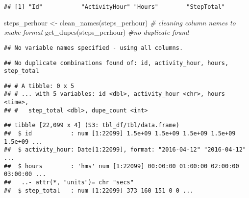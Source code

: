 \documentclass[
]{article}
\newenvironment{Shaded}{\begin{snugshade}}{\end{snugshade}}
\newcommand{\CommentTok}[1]{\textcolor[rgb]{0.56,0.35,0.01}{\textit{#1}}}
\newcommand{\FunctionTok}[1]{\textcolor[rgb]{0.00,0.00,0.00}{#1}}
\newcommand{\NormalTok}[1]{#1}
\newcommand{\OtherTok}[1]{\textcolor[rgb]{0.56,0.35,0.01}{#1}}
\newcommand{\SpecialCharTok}[1]{\textcolor[rgb]{0.00,0.00,0.00}{#1}}
\newcommand{\StringTok}[1]{\textcolor[rgb]{0.31,0.60,0.02}{#1}}
\begin{document}
\begin{verbatim}
## [1] "Id"           "ActivityHour" "Hours"        "StepTotal"
\end{verbatim}

\begin{Shaded}
\begin{Highlighting}[]
\NormalTok{ steps\_perhour }\OtherTok{\textless{}{-}} \FunctionTok{clean\_names}\NormalTok{(steps\_perhour) }\CommentTok{\# cleaning column names to snake format}
 \FunctionTok{get\_dupes}\NormalTok{(steps\_perhour) }\CommentTok{\#no duplicate found}
\end{Highlighting}
\end{Shaded}

\begin{verbatim}
## No variable names specified - using all columns.
\end{verbatim}

\begin{verbatim}
## No duplicate combinations found of: id, activity_hour, hours, step_total
\end{verbatim}

\begin{verbatim}
## # A tibble: 0 x 5
## # ... with 5 variables: id <dbl>, activity_hour <chr>, hours <time>,
## #   step_total <dbl>, dupe_count <int>
\end{verbatim}

\begin{Shaded}
\end{Shaded}

\begin{verbatim}
## tibble [22,099 x 4] (S3: tbl_df/tbl/data.frame)
##  $ id           : num [1:22099] 1.5e+09 1.5e+09 1.5e+09 1.5e+09 1.5e+09 ...
##  $ activity_hour: Date[1:22099], format: "2016-04-12" "2016-04-12" ...
##  $ hours        : 'hms' num [1:22099] 00:00:00 01:00:00 02:00:00 03:00:00 ...
##   ..- attr(*, "units")= chr "secs"
##  $ step_total   : num [1:22099] 373 160 151 0 0 ...
\end{verbatim}
\end{document}
